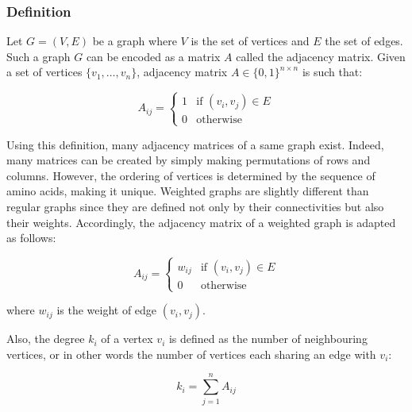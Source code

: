 
    \subsubsection{Definition}

        Let $G = (V, E)$ be a graph where $V$ is the set of vertices and $E$ the set of edges. Such a graph $G$ can be encoded as a matrix $A$ called
        the adjacency matrix. Given a set of vertices $\{ v_1, \ldots, v_n \}$, adjacency matrix $A \in \{ 0, 1 \}^{n \times n}$ is such that:

        \begin{equation}    
            A_{ij} =
                \begin{cases}
                    1 & \text{if } (v_i, v_j) \in E \\
                    0 & \text{otherwise}
                \end{cases}
        \end{equation}

        Using this definition, many adjacency matrices of a same graph exist. Indeed, many matrices can be created by simply
        making permutations of rows and columns. However, the ordering of vertices is determined by the sequence
        of amino acids, making it unique.
        Weighted graphs are slightly different than regular graphs since they are defined not only by their connectivities but also their weights.
        Accordingly, the adjacency matrix of a weighted graph is adapted as follows:

        \begin{equation}    
            A_{ij} =
                \begin{cases}
                    w_{ij} & \text{if } (v_i, v_j) \in E \\
                    0 & \text{otherwise}
                \end{cases}       
        \end{equation}

        where $w_{ij}$ is the weight of edge $(v_i, v_j)$.

        Also, the degree $k_i$ of a vertex $v_i$ is defined as the number of neighbouring vertices, or in other
        words the number of vertices each sharing an edge with $v_i$:

        \begin{equation}
            k_i = \sum\limits_{j=1}^{n} A_{ij}
        \end{equation}


